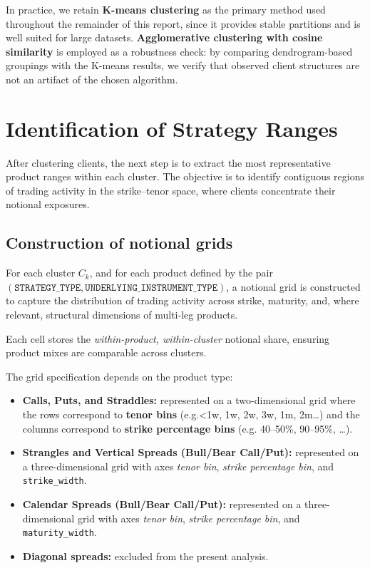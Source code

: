 \documentclass[12pt,a4paper]{report}
\begin{document}
In practice, we retain \textbf{K-means clustering} as the primary method used throughout the remainder of this report, since it provides stable partitions and is well suited for large datasets. \textbf{Agglomerative clustering with cosine similarity} is employed as a robustness check: by comparing dendrogram-based groupings with the K-means results, we verify that observed client structures are not an artifact of the chosen algorithm.


\section{Identification of Strategy Ranges}

After clustering clients, the next step is to extract the most representative product ranges within each cluster. The objective is to identify contiguous regions of trading activity in the strike–tenor space, where clients concentrate their notional exposures. 

\subsection{Construction of notional grids}

For each cluster \(C_k\), and for each product defined by the pair 
\((\texttt{STRATEGY\_TYPE}, \texttt{UNDERLYING\_INSTRUMENT\_TYPE})\), a notional grid is 
constructed to capture the distribution of trading activity across strike, maturity, and, 
where relevant, structural dimensions of multi-leg products.

Each cell stores the \emph{within-product, within-cluster} notional share, ensuring product mixes are comparable across clusters.


The grid specification depends 
on the product type:

\begin{itemize}
    \item \textbf{Calls, Puts, and Straddles:} represented on a two-dimensional grid 
    where the rows correspond to \textbf{tenor bins} (e.g.<1w, 1w, 2w, 3w, 1m, 2m…) and the columns correspond to \textbf{strike percentage bins} (e.g. 40–50\%, 90–95\%, …).

    \item \textbf{Strangles and Vertical Spreads (Bull/Bear Call/Put):} represented on a 
    three-dimensional grid with axes \emph{tenor bin}, \emph{strike percentage bin}, and 
    \texttt{strike\_width}.  
    \item \textbf{Calendar Spreads (Bull/Bear Call/Put):} represented on a 
    three-dimensional grid with axes \emph{tenor bin}, \emph{strike percentage bin}, and 
    \texttt{maturity\_width}.  
    \item \textbf{Diagonal spreads:} excluded from the present analysis.  
\end{itemize}
\end{document}
